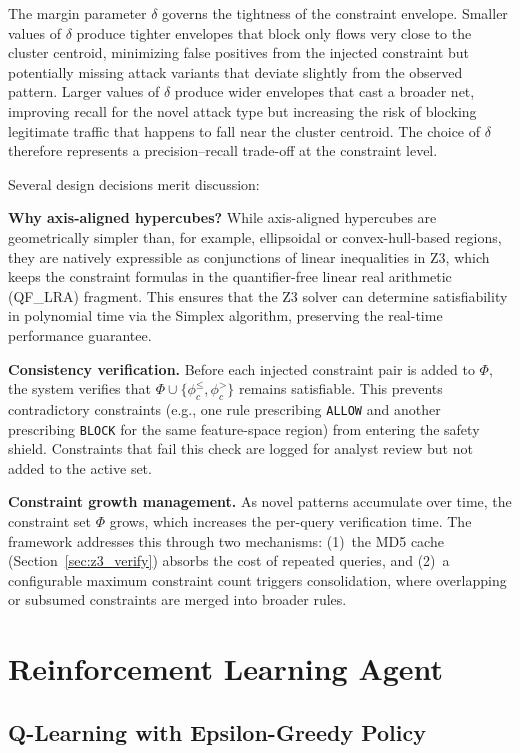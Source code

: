 \documentclass[12pt, letterpaper, oneside]{report}
\begin{document}
The margin parameter $\delta$ governs the tightness of the constraint envelope. Smaller values of $\delta$ produce tighter envelopes that block only flows very close to the cluster centroid, minimizing false positives from the injected constraint but potentially missing attack variants that deviate slightly from the observed pattern. Larger values of $\delta$ produce wider envelopes that cast a broader net, improving recall for the novel attack type but increasing the risk of blocking legitimate traffic that happens to fall near the cluster centroid. The choice of $\delta$ therefore represents a precision--recall trade-off at the constraint level.

Several design decisions merit discussion:

\textbf{Why axis-aligned hypercubes?} While axis-aligned hypercubes are geometrically simpler than, for example, ellipsoidal or convex-hull-based regions, they are natively expressible as conjunctions of linear inequalities in Z3, which keeps the constraint formulas in the quantifier-free linear real arithmetic (QF\_LRA) fragment. This ensures that the Z3 solver can determine satisfiability in polynomial time via the Simplex algorithm, preserving the real-time performance guarantee.

\textbf{Consistency verification.} Before each injected constraint pair is added to $\Phi$, the system verifies that $\Phi \cup \{\phi_c^{\leq}, \phi_c^{>}\}$ remains satisfiable. This prevents contradictory constraints (e.g., one rule prescribing \texttt{ALLOW} and another prescribing \texttt{BLOCK} for the same feature-space region) from entering the safety shield. Constraints that fail this check are logged for analyst review but not added to the active set.

\textbf{Constraint growth management.} As novel patterns accumulate over time, the constraint set $\Phi$ grows, which increases the per-query verification time. The framework addresses this through two mechanisms: (1)~the MD5 cache (Section~\ref{sec:z3_verify}) absorbs the cost of repeated queries, and (2)~a configurable maximum constraint count triggers consolidation, where overlapping or subsumed constraints are merged into broader rules.


\section{Reinforcement Learning Agent}
\label{sec:rl_agent}

\subsection{Q-Learning with Epsilon-Greedy Policy}
\end{document}
